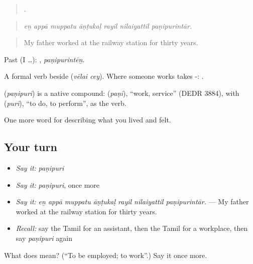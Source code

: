 \begin{quote}
      .
\end{quote}

\begin{quote}
\emph{eṉ appā muppatu āṇṭukaḷ rayil nilaiyattil paṇipurintār.}
\end{quote}

\begin{quote}
My father worked at the railway station for thirty years.
\end{quote}

Past (I …): , \emph{paṇipurintēṉ}.

A formal verb beside   (\emph{vēlai cey}). Where someone works takes -:  .

\begin{cousinweb}
\textbf{} (\emph{paṇipuri}) is a native compound:  (\emph{paṇi}), \textquotedblleft{}work, service\textquotedblright{} (DEDR 3884), with  (\emph{puri}), \textquotedblleft{}to do, to perform\textquotedblright{}, as the verb.
\end{cousinweb}

\begin{grammarlens}[title={What you've built}]
One more word for describing what you lived and felt.
\end{grammarlens}

\subsection*{Your turn}
\begin{itemize}
\raggedright
  \item \emph{Say it:} \emph{paṇipuri}
  \item \emph{Say it:} \emph{paṇipuri}, once more
  \item \emph{Say it:} \emph{eṉ appā muppatu āṇṭukaḷ rayil nilaiyattil paṇipurintār.} — My father worked at the railway station for thirty years.
  \item \emph{Recall:} say the Tamil for an assistant, then the Tamil for a workplace, then say \emph{paṇipuri} again
\end{itemize}

\begin{tcolorbox}[breakable,colback=teal!4,colframe=teal!35!black,title={Before you move on}]
What does  mean? (\textquotedblleft{}To be employed; to work\textquotedblright{}.) Say it once more.
\end{tcolorbox}
